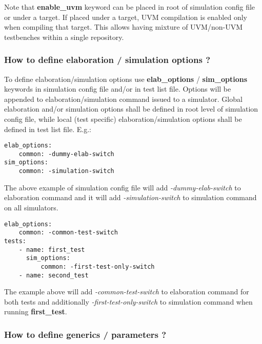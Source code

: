 \documentclass{tropic_design_spec}
\begin{document}
Note that \textbf{enable_uvm} keyword can be placed in root of simulation config file
or under a target. If placed under a target, UVM compilation is enabled only when
compiling that target. This allows having mixture of UVM/non-UVM testbenches within a
single repository.


\subsubsection{How to define elaboration / simulation options ?}
\label{sec:how-to-define-elaboration-simulation-options}

To define elaboration/simulation options use \textbf{elab_options} / \textbf{sim_options}
keywords in simulation config file and/or in test list file. Options will
be appended to elaboration/simulation command issued to a simulator. Global elaboration
and/or simulation options shall be defined in root level of simulation config file, while
local (test specific) elaboration/simulation options shall be defined in test list file.
E.g.:

\begin{lstlisting}
elab_options:
    common: -dummy-elab-switch
sim_options:
    common: -simulation-switch
\end{lstlisting}

The above example of simulation config file will add \textit{-dummy-elab-switch} to
elaboration command and it will add \textit{-simulation-switch} to simulation command
on all simulators.

\begin{lstlisting}
elab_options:
    common: -common-test-switch
tests:
    - name: first_test
      sim_options:
          common: -first-test-only-switch
    - name: second_test
\end{lstlisting}

The example above will add \textit{-common-test-switch} to elaboration command for
both tests and additionally \textit{-first-test-only-switch} to simulation command
when running \textbf{first_test}.


\subsubsection{How to define generics / parameters ?}
\label{sec:how-to-define-generics-parameters}
\end{document}
